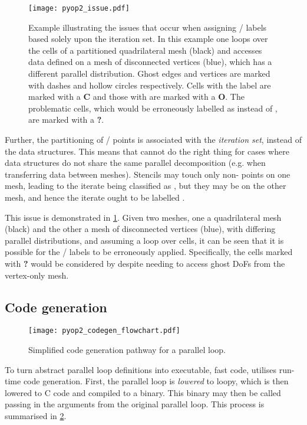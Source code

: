 \documentclass[thesis]{subfiles}
\begin{document}
\begin{figure}
  \centering
  \texttt{[image: pyop2\_issue.pdf]}
  \caption{
    Example illustrating the issues that occur when assigning \coreiter{}/\ownediter{} labels based solely upon the iteration set.
    In this example one loops over the cells of a partitioned quadrilateral mesh (black) and accesses data defined on a mesh of disconnected vertices (blue), which has a different parallel distribution.
    Ghost edges and vertices are marked with dashes and hollow circles respectively.
    Cells with the label \coreiter{} are marked with a \textbf{C} and those with \ownediter{} are marked with a \textbf{O}.
    The problematic cells, which would be erroneously labelled as \coreiter{} instead of \ownediter{}, are marked with a \textbf{?}.
  }
  \label{fig:pyop2_issue}
\end{figure}

Further, the partitioning of \coreiter{}/\ownediter{} points is associated with the \emph{iteration set}, instead of the data structures.
This means that  cannot do the right thing for cases where data structures do not share the same parallel decomposition (e.g. when transferring data between meshes).
Stencils may touch only non-\ghostiter{} points on one mesh, leading to the iterate being classified as \coreiter{}, but they may be \ghostiter{} on the other mesh, and hence the iterate ought to be labelled \ownediter{}.

This issue is demonstrated in \cref{fig:pyop2_issue}.
Given two meshes, one a quadrilateral mesh (black) and the other a mesh of disconnected vertices (blue), with differing parallel distributions, and assuming a loop over cells, it can be seen that it is possible for the \coreiter{}/\ownediter{} labels to be erroneously applied.
Specifically, the cells marked with \textbf{?} would be considered \coreiter{} by  despite needing to access ghost DoFs from the vertex-only mesh.

\subsection{Code generation}
\label{sec:pyop2_codegen}

\begin{figure}
  \texttt{[image: pyop2\_codegen\_flowchart.pdf]}
  \caption{Simplified code generation pathway for a  parallel loop.}
  \label{fig:pyop2_codegen}
\end{figure}

To turn abstract parallel loop definitions into executable, fast code,  utilises run-time code generation.
First, the parallel loop is \emph{lowered} to loopy, which is then lowered to C code and compiled to a binary.
This binary may then be called passing in the arguments from the original parallel loop.
This process is summarised in \cref{fig:pyop2_codegen}.
\end{document}

